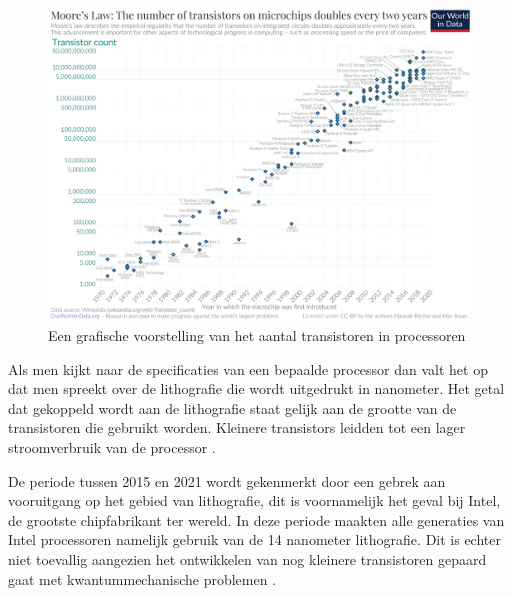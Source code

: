 \begin{figure}[!htb]
    \centering
    \includegraphics[width=\linewidth]{img/transistorcountovertime.jpg}
    \caption{Een grafische voorstelling van het aantal transistoren in processoren \autocite{HannahRitchie2020}}
\end{figure}

Als men kijkt naar de specificaties van een bepaalde processor dan valt het op dat men spreekt over de lithografie die wordt uitgedrukt in nanometer. Het getal dat gekoppeld wordt aan de lithografie staat gelijk aan de grootte van de transistoren die gebruikt worden. Kleinere transistors leidden tot een lager stroomverbruik van de processor \autocite{Heddings2019}.

De periode tussen 2015 en 2021 wordt gekenmerkt door een gebrek aan vooruitgang op het gebied van lithografie, dit is voornamelijk het geval bij Intel, de grootste chipfabrikant ter wereld. In deze periode maakten alle generaties van Intel processoren namelijk gebruik van de 14 nanometer lithografie. Dit is echter niet toevallig aangezien het ontwikkelen van nog kleinere transistoren gepaard gaat met kwantummechanische problemen \autocite{Intel2021}.

